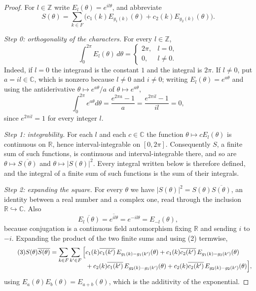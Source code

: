\begin{proof}
For $l\in\mathbb{Z}$ write $E_l(\theta)=e^{il\theta}$, and abbreviate
\[
  S(\theta)=\sum_{k\in F}\bigl(c_1(k)E_{g_1(k)}(\theta)
    +c_2(k)E_{g_2(k)}(\theta)\bigr).
\]

\emph{Step 0: orthogonality of the characters.}  For every $l\in\mathbb{Z}$,
\begin{equation}\tag{1}
  \int_{0}^{2\pi}E_l(\theta)\,d\theta
  =\begin{cases}2\pi,&l=0,\\[2pt]0,&l\neq0.\end{cases}
\end{equation}
Indeed, if $l=0$ the integrand is the constant $1$ and the integral is $2\pi$.
If $l\neq0$, put $a=il\in\mathbb{C}$, which is nonzero because $l\neq0$ and
$i\neq0$; writing $E_l(\theta)=e^{a\theta}$ and using the antiderivative
$\theta\mapsto e^{a\theta}/a$ of $\theta\mapsto e^{a\theta}$,
\[
  \int_{0}^{2\pi}e^{a\theta}d\theta=\frac{e^{2\pi a}-1}{a}
  =\frac{e^{2\pi i l}-1}{il}=0,
\]
since $e^{2\pi il}=1$ for every integer $l$.

\emph{Step 1: integrability.}  For each $l$ and each $c\in\mathbb{C}$ the
function $\theta\mapsto cE_l(\theta)$ is continuous on $\mathbb{R}$, hence
interval-integrable on $[0,2\pi]$.  Consequently $S$, a finite sum of such
functions, is continuous and interval-integrable there, and so are
$\theta\mapsto\overline{S(\theta)}$ and $\theta\mapsto|S(\theta)|^{2}$.  Every
integral written below is therefore defined, and the integral of a finite sum
of such functions is the sum of their integrals.

\emph{Step 2: expanding the square.}  For every $\theta$ we have
$|S(\theta)|^{2}=S(\theta)\overline{S(\theta)}$, an identity between a real
number and a complex one, read through the inclusion
$\mathbb{R}\hookrightarrow\mathbb{C}$.  Also
\begin{equation}\tag{2}
  \overline{E_l(\theta)}=\overline{e^{il\theta}}=e^{-il\theta}
  =E_{-l}(\theta),
\end{equation}
because conjugation is a continuous field automorphism fixing $\mathbb{R}$ and
sending $i$ to $-i$.  Expanding the product of the two finite sums and using
(2) termwise,
\begin{equation}\tag{3}
  S(\theta)\overline{S(\theta)}
  =\sum_{k\in F}\sum_{k'\in F}
    \begin{aligned}[t]
      \Bigl[&c_1(k)\overline{c_1(k')}\,E_{g_1(k)-g_1(k')}(\theta)
       +c_1(k)\overline{c_2(k')}\,E_{g_1(k)-g_2(k')}(\theta)\\
      &{}+c_2(k)\overline{c_1(k')}\,E_{g_2(k)-g_1(k')}(\theta)
       +c_2(k)\overline{c_2(k')}\,E_{g_2(k)-g_2(k')}(\theta)\Bigr],
    \end{aligned}
\end{equation}
using $E_a(\theta)E_b(\theta)=E_{a+b}(\theta)$, which is the additivity of the
exponential.


\end{proof}
